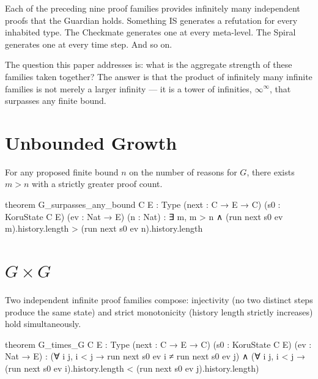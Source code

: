 Each of the preceding nine proof families provides infinitely many independent proofs that the Guardian holds. Something IS generates a refutation for every inhabited type. The Checkmate generates one at every meta-level. The Spiral generates one at every time step. And so on.

The question this paper addresses is: what is the aggregate strength of these families taken together? The answer is that the product of infinitely many infinite families is not merely a larger infinity --- it is a tower of infinities, $\infty^\infty$, that surpasses any finite bound.

\section{Unbounded Growth}

\begin{theorem}\label{thm:surpasses}
For any proposed finite bound $n$ on the number of reasons for $G$, there exists $m > n$ with a strictly greater proof count.
\end{theorem}

\begin{leancode}
theorem G_surpasses_any_bound {C E : Type}
    (next : C → E → C) (s0 : KoruState C E)
    (ev : Nat → E) (n : Nat) :
    ∃ m, m > n ∧
        (run next s0 ev m).history.length >
        (run next s0 ev n).history.length
\end{leancode}

\section{$G \times G$}

\begin{theorem}\label{thm:product}
Two independent infinite proof families compose: injectivity (no two distinct steps produce the same state) and strict monotonicity (history length strictly increases) hold simultaneously.
\end{theorem}

\begin{leancode}
theorem G_times_G {C E : Type}
    (next : C → E → C) (s0 : KoruState C E)
    (ev : Nat → E) :
    (∀ i j, i < j → run next s0 ev i ≠ run next s0 ev j) ∧
    (∀ i j, i < j →
        (run next s0 ev i).history.length <
        (run next s0 ev j).history.length)
\end{leancode}

